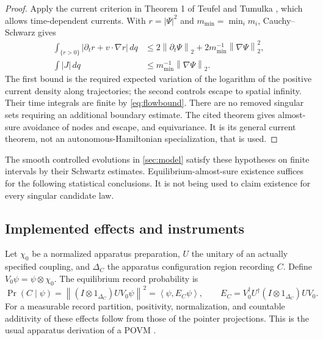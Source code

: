 \documentclass[11pt]{article}
\numberwithin{equation}{section}
\theoremstyle{definition}
\newcommand{\norm}[1]{\left\|#1\right\|}
\newcommand{\ip}[2]{\left\langle #1,#2\right\rangle}
\begin{document}
\begin{proof}
Apply the current criterion in Theorem 1 of Teufel and Tumulka \cite{TT2005}, which allows time-dependent currents. With \(r=|\Psi|^2\) and \(m_{\min}=\min_i m_i\), Cauchy--Schwarz gives
\begin{align*}
 \int_{\{r>0\}}|\partial_t r+v\cdot\nabla r|\,dq
 &\le 2\norm{\partial_t\Psi}_2+
             2m_{\min}^{-1}\norm{\nabla\Psi}_2^2,\\
 \int |J|\,dq&\le m_{\min}^{-1}\norm{\nabla\Psi}_2 .
\end{align*}
The first bound is the required expected variation of the logarithm of the positive current density along trajectories; the second controls escape to spatial infinity. Their time integrals are finite by \eqref{eq:flowbound}. There are no removed singular sets requiring an additional boundary estimate. The cited theorem gives almost-sure avoidance of nodes and escape, and equivariance. It is its general current theorem, not an autonomous-Hamiltonian specialization, that is used.
\end{proof}

The smooth controlled evolutions in \cref{sec:model} satisfy these hypotheses on finite intervals by their Schwartz estimates. Equilibrium-almost-sure existence suffices for the following statistical conclusions. It is not being used to claim existence for every singular candidate law.

\subsection{Implemented effects and instruments}

Let \(\chi_0\) be a normalized apparatus preparation, \(U\) the unitary of an actually specified coupling, and \(\Delta_C\) the apparatus configuration region recording \(C\). Define \(V_0\psi=\psi\otimes\chi_0\). The equilibrium record probability is
\begin{equation}\label{eq:effect}
 \Pr(C\mid\psi)=\norm{(I\otimes1_{\Delta_C})UV_0\psi}^2
       =\ip{\psi}{E_C\psi},\qquad
 E_C=V_0^\dagger U^\dagger(I\otimes1_{\Delta_C})UV_0.
\end{equation}
For a measurable record partition, positivity, normalization, and countable additivity of these effects follow from those of the pointer projections. This is the usual apparatus derivation of a POVM \cite{DGZ2004}.
\end{document}

